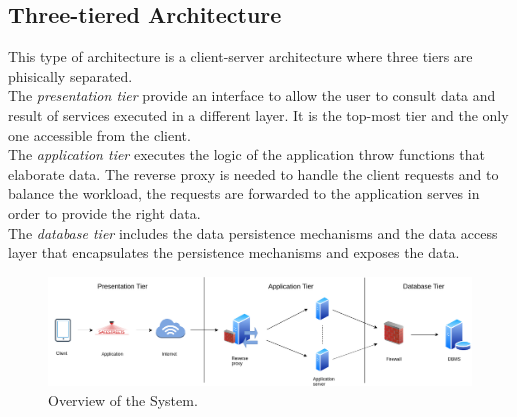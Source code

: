 \documentclass{report}
\begin{document}
\subsection{Three-tiered Architecture}
This type of architecture is a client-server architecture where three tiers are phisically separated.\\
The \textit{presentation tier} provide an interface to allow the user to consult data and result of services executed in a different layer. 
It is the top-most tier and the only one accessible from the client.\\
The \textit{application tier} executes the logic of the application throw functions that elaborate data. 
The reverse proxy is needed to handle the client requests and to balance the workload, the requests are forwarded to 
the application serves in order to provide the right data.\\
The \textit{database tier} includes the data persistence mechanisms and the data access layer that encapsulates 
the persistence mechanisms and exposes the data.
\begin{figure}[!ht]
	\begin{center}
	\includegraphics[width=\textwidth]{img/TiersArchitecture.png}
	\end{center}
	\caption{Overview of the System.}
\end{figure}
\end{document}
